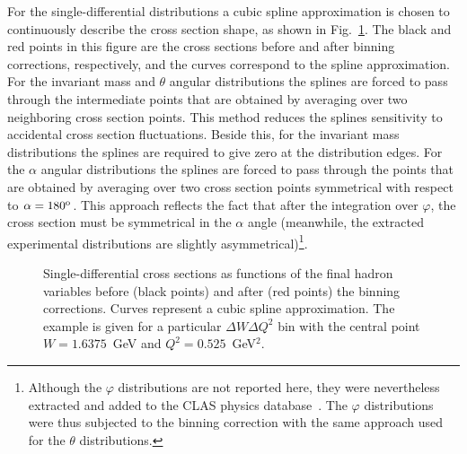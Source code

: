For the single-differential distributions a cubic spline approximation is chosen to continuously describe the cross section shape, as shown in Fig.~\ref{fig:bin_cor_1d}. The black and red points in this figure are the cross sections before and after binning corrections, respectively, and the curves correspond to the spline approximation. For the invariant mass and $\theta$ angular distributions the splines are forced to pass through the intermediate points that are obtained by averaging over two neighboring cross section points. This method reduces the splines sensitivity to accidental cross section fluctuations. Beside this, for the invariant mass distributions the splines are required to give zero at the distribution edges. For the $\alpha$ angular distributions the splines are forced to pass through the points that are obtained by averaging over two cross section points symmetrical with respect to $\alpha = 180^{\rm o}$. This approach reflects the fact that after the integration over $\varphi$, the cross section must be symmetrical in the $\alpha$ angle (meanwhile, the extracted experimental distributions are slightly asymmetrical)\footnote[5]{Although the $\varphi$ distributions are not reported here, they were nevertheless extracted and added to the CLAS physics database~\cite{CLAS_DB}. The $\varphi$ distributions were thus subjected to the binning correction with the same approach used for the $\theta$ distributions.}.

\begin{figure}[htp]
\begin{center}
\caption{\small Single-differential cross sections as functions of the final hadron variables before (black points) and after (red points) the binning corrections. Curves represent a cubic spline approximation. The example is given for a particular $\Delta W \Delta Q^{2}$ bin with the central point $W=1.6375$~GeV and $Q^{2}=0.525$~GeV$^{2}$.  } \label{fig:bin_cor_1d}
\end{center}
\end{figure}



